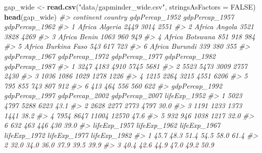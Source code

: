 \documentclass[
]{book}
\newenvironment{Shaded}{\begin{snugshade}}{\end{snugshade}}
\newcommand{\CommentTok}[1]{\textcolor[rgb]{0.56,0.35,0.01}{\textit{#1}}}
\newcommand{\DataTypeTok}[1]{\textcolor[rgb]{0.13,0.29,0.53}{#1}}
\newcommand{\KeywordTok}[1]{\textcolor[rgb]{0.13,0.29,0.53}{\textbf{#1}}}
\newcommand{\NormalTok}[1]{#1}
\newcommand{\OtherTok}[1]{\textcolor[rgb]{0.56,0.35,0.01}{#1}}
\newcommand{\StringTok}[1]{\textcolor[rgb]{0.31,0.60,0.02}{#1}}
\begin{document}
\begin{Shaded}
\begin{Highlighting}[]
\NormalTok{gap_wide <-}\StringTok{ }\KeywordTok{read.csv}\NormalTok{(}\StringTok{"data/gapminder_wide.csv"}\NormalTok{, }\DataTypeTok{stringsAsFactors =} \OtherTok{FALSE}\NormalTok{)}
\KeywordTok{head}\NormalTok{(gap_wide)}
\CommentTok{#>   continent      country gdpPercap_1952 gdpPercap_1957 gdpPercap_1962}
\CommentTok{#> 1    Africa      Algeria           2449           3014           2551}
\CommentTok{#> 2    Africa       Angola           3521           3828           4269}
\CommentTok{#> 3    Africa        Benin           1063            960            949}
\CommentTok{#> 4    Africa     Botswana            851            918            984}
\CommentTok{#> 5    Africa Burkina Faso            543            617            723}
\CommentTok{#> 6    Africa      Burundi            339            380            355}
\CommentTok{#>   gdpPercap_1967 gdpPercap_1972 gdpPercap_1977 gdpPercap_1982 gdpPercap_1987}
\CommentTok{#> 1           3247           4183           4910           5745           5681}
\CommentTok{#> 2           5523           5473           3009           2757           2430}
\CommentTok{#> 3           1036           1086           1029           1278           1226}
\CommentTok{#> 4           1215           2264           3215           4551           6206}
\CommentTok{#> 5            795            855            743            807            912}
\CommentTok{#> 6            413            464            556            560            622}
\CommentTok{#>   gdpPercap_1992 gdpPercap_1997 gdpPercap_2002 gdpPercap_2007 lifeExp_1952}
\CommentTok{#> 1           5023           4797           5288           6223         43.1}
\CommentTok{#> 2           2628           2277           2773           4797         30.0}
\CommentTok{#> 3           1191           1233           1373           1441         38.2}
\CommentTok{#> 4           7954           8647          11004          12570         47.6}
\CommentTok{#> 5            932            946           1038           1217         32.0}
\CommentTok{#> 6            632            463            446            430         39.0}
\CommentTok{#>   lifeExp_1957 lifeExp_1962 lifeExp_1967 lifeExp_1972 lifeExp_1977 lifeExp_1982}
\CommentTok{#> 1         45.7         48.3         51.4         54.5         58.0         61.4}
\CommentTok{#> 2         32.0         34.0         36.0         37.9         39.5         39.9}
\CommentTok{#> 3         40.4         42.6         44.9         47.0         49.2         50.9}

\end{Highlighting}
\end{Shaded}
\end{document}
